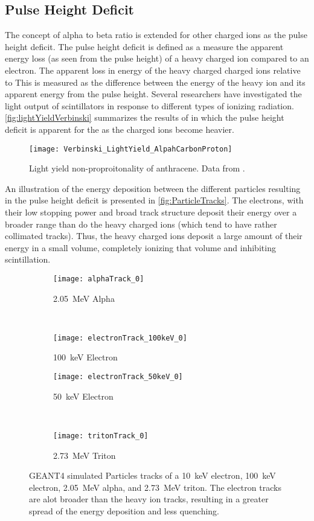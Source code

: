 \subsection{Pulse Height Deficit}
The concept of alpha to beta ratio is extended for other charged ions as the pulse height deficit.
The pulse height deficit is defined as a measure the apparent energy loss (as seen from the pulse height) of a heavy charged ion compared to an electron.  
The apparent loss in energy of the heavy charged charged ions relative to
This is measured as the difference between the energy of the heavy ion and its apparent energy from the pulse height.  
Several researchers have investigated the light output of scintillators in response to different types of ionizing radiation.
\autoref{fig:lightYieldVerbinski} summarizes the results of \cite{Verbinski_1968} in which the pulse height deficit is apparent for the as the charged ions become heavier.
\begin{figure}
  \centering
  \texttt{[image: Verbinski\_LightYield\_AlpahCarbonProton]}
  \caption[Light yield non-proporitonality of anthracene]{Light yield non-proproitonality of anthracene. Data from \cite{Verbinski_1968}.}
  \label{fig:lightYieldVerbinski}
\end{figure}

An illustration of the energy deposition between the different particles resulting in the pulse height deficit is presented in \autoref{fig:ParticleTracks}.
The electrons, with their low stopping power and broad track structure deposit their energy over a broader range than do the heavy charged ions (which tend to have rather collimated tracks).
Thus, the heavy charged ions deposit a large amount of their energy in a small volume, completely ionizing that volume and inhibiting scintillation.
\begin{figure}
  \begin{subfigure}[b]{0.45\textwidth}
    \texttt{[image: alphaTrack\_0]}
    \caption{\SI{2.05}{\MeV} Alpha}
  \end{subfigure}%
  ~
  \begin{subfigure}[b]{0.45\textwidth}
    \texttt{[image: electronTrack\_100keV\_0]}
    \caption{\SI{100}{\keV} Electron}
  \end{subfigure}
  
  \begin{subfigure}[b]{0.45\textwidth}
    \texttt{[image: electronTrack\_50keV\_0]}
    \caption{\SI{50}{\keV} Electron}
  \end{subfigure}%
  ~
  \begin{subfigure}[b]{0.45\textwidth}
    \texttt{[image: tritonTrack\_0]}
    \caption{\SI{2.73}{\MeV} Triton}
  \end{subfigure}
  \caption[Particle Tracks of Alpha, Triton and Electrons]{GEANT4 simulated Particles tracks of a \SI{10}{\keV} electron, \SI{100}{\keV} electron, \SI{2.05}{\MeV} alpha, and \SI{2.73}{\MeV} triton.  The electron tracks are alot broader than the heavy ion tracks, resulting in a greater spread of the energy deposition and less quenching.}
  \label{fig:ParticleTracks}
\end{figure}

